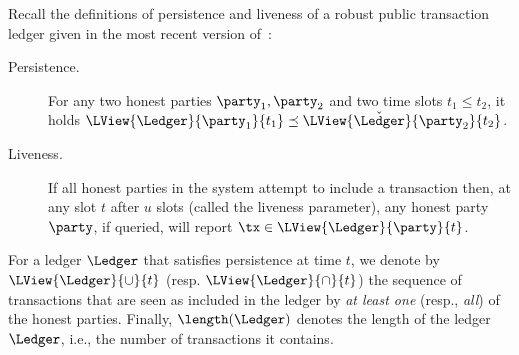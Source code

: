 Recall the definitions of persistence and liveness of a robust public
transaction ledger given in the most recent version of~\cite{backbone}:

\begin{description}
  \item[Persistence.]
    For any two honest parties $\party_1,\party_2$ and two time slots $t_1\leq t_2$,
    it holds  $\LView{\Ledger}{\party_1}{t_1} \preceq
    \LView{\check{\Ledger}}{\party_2}{t_2}$.

  \item[Liveness.]
    If all honest parties in the system attempt to include a  transaction
    then, at any slot $t$ after $u$ slots (called the
    liveness parameter), any honest party $\party$, if queried,
    will report $\tx \in \LView{\Ledger}{\party}{t}$.
\end{description}

For a ledger $\Ledger$ that satisfies persistence at time $t$, we denote by $\LView{\Ledger}{\cup}{t}$ (resp.
$\LView{\Ledger}{\cap}{t}$) the sequence of transactions that are seen as
included in the ledger by \emph{at least one} (resp., \emph{all}) of the honest
parties. Finally, $\length(\Ledger)$ denotes the length of the ledger $\Ledger$,
i.e., the number of transactions it contains.
